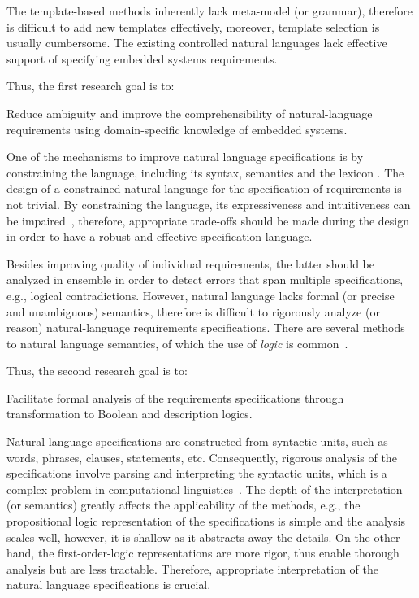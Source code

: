 The template-based methods inherently lack meta-model (or grammar), therefore is difficult to add new templates effectively, moreover, template selection is usually cumbersome. The existing controlled natural languages lack effective support of specifying embedded systems requirements.

Thus, the first research goal is to:
\setcounter{rgcounter}{1}
\begin{researchgoal}
Reduce ambiguity and improve the comprehensibility of natural-language requirements using domain-specific knowledge of embedded systems.
\end{researchgoal}

One of the mechanisms to improve natural language specifications is by constraining the language, including its syntax, semantics and the lexicon \cite{Kuhn2014ALanguages}. The design of a constrained natural language for the specification of requirements is not trivial. By constraining the language, its expressiveness and intuitiveness can be impaired~\cite{ieereqspecstandard}\cite{Myachykov2013SyntacticRussian}, therefore, appropriate trade-offs should be made during the design in order to have a robust and effective specification language.

Besides improving quality of individual requirements, the latter should be analyzed in ensemble in order to detect errors that span multiple specifications, e.g., logical contradictions. However, natural language lacks formal (or precise and unambiguous) semantics, therefore is difficult to rigorously analyze (or reason) natural-language requirements specifications. There are several methods to natural language semantics, of which the use of \textit{logic} is common~\cite{Clark2010TheProcessing}.

Thus, the second research goal is to:
\begin{researchgoal}
Facilitate formal analysis of the requirements specifications through transformation to Boolean and description logics.
\end{researchgoal}

Natural language specifications are constructed from syntactic units, such as words, phrases, clauses, statements, etc. Consequently, rigorous analysis of the specifications involve parsing and interpreting the syntactic units, which is a complex problem in computational linguistics~\cite{Clark2010TheProcessing}. The depth of the interpretation (or semantics) greatly affects the applicability of the methods, e.g., the propositional logic representation of the specifications is simple and the analysis scales well, however, it is shallow as it abstracts away the details. On the other hand, the first-order-logic representations are more rigor, thus enable thorough analysis but are less tractable. Therefore, appropriate interpretation of the natural language specifications is crucial.

